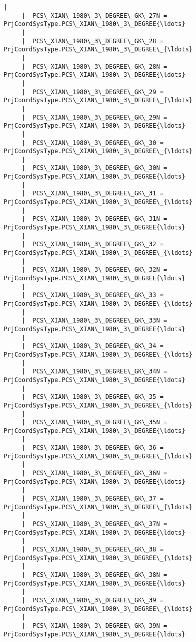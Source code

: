 \documentclass[11pt]{article}
\begin{document}
\begin{Verbatim}[commandchars=\\\{\}]
     |  
     |  PCS\_XIAN\_1980\_3\_DEGREE\_GK\_27N = PrjCoordSysType.PCS\_XIAN\_1980\_3\_DEGREE{\ldots}
     |  
     |  PCS\_XIAN\_1980\_3\_DEGREE\_GK\_28 = PrjCoordSysType.PCS\_XIAN\_1980\_3\_DEGREE\_{\ldots}
     |  
     |  PCS\_XIAN\_1980\_3\_DEGREE\_GK\_28N = PrjCoordSysType.PCS\_XIAN\_1980\_3\_DEGREE{\ldots}
     |  
     |  PCS\_XIAN\_1980\_3\_DEGREE\_GK\_29 = PrjCoordSysType.PCS\_XIAN\_1980\_3\_DEGREE\_{\ldots}
     |  
     |  PCS\_XIAN\_1980\_3\_DEGREE\_GK\_29N = PrjCoordSysType.PCS\_XIAN\_1980\_3\_DEGREE{\ldots}
     |  
     |  PCS\_XIAN\_1980\_3\_DEGREE\_GK\_30 = PrjCoordSysType.PCS\_XIAN\_1980\_3\_DEGREE\_{\ldots}
     |  
     |  PCS\_XIAN\_1980\_3\_DEGREE\_GK\_30N = PrjCoordSysType.PCS\_XIAN\_1980\_3\_DEGREE{\ldots}
     |  
     |  PCS\_XIAN\_1980\_3\_DEGREE\_GK\_31 = PrjCoordSysType.PCS\_XIAN\_1980\_3\_DEGREE\_{\ldots}
     |  
     |  PCS\_XIAN\_1980\_3\_DEGREE\_GK\_31N = PrjCoordSysType.PCS\_XIAN\_1980\_3\_DEGREE{\ldots}
     |  
     |  PCS\_XIAN\_1980\_3\_DEGREE\_GK\_32 = PrjCoordSysType.PCS\_XIAN\_1980\_3\_DEGREE\_{\ldots}
     |  
     |  PCS\_XIAN\_1980\_3\_DEGREE\_GK\_32N = PrjCoordSysType.PCS\_XIAN\_1980\_3\_DEGREE{\ldots}
     |  
     |  PCS\_XIAN\_1980\_3\_DEGREE\_GK\_33 = PrjCoordSysType.PCS\_XIAN\_1980\_3\_DEGREE\_{\ldots}
     |  
     |  PCS\_XIAN\_1980\_3\_DEGREE\_GK\_33N = PrjCoordSysType.PCS\_XIAN\_1980\_3\_DEGREE{\ldots}
     |  
     |  PCS\_XIAN\_1980\_3\_DEGREE\_GK\_34 = PrjCoordSysType.PCS\_XIAN\_1980\_3\_DEGREE\_{\ldots}
     |  
     |  PCS\_XIAN\_1980\_3\_DEGREE\_GK\_34N = PrjCoordSysType.PCS\_XIAN\_1980\_3\_DEGREE{\ldots}
     |  
     |  PCS\_XIAN\_1980\_3\_DEGREE\_GK\_35 = PrjCoordSysType.PCS\_XIAN\_1980\_3\_DEGREE\_{\ldots}
     |  
     |  PCS\_XIAN\_1980\_3\_DEGREE\_GK\_35N = PrjCoordSysType.PCS\_XIAN\_1980\_3\_DEGREE{\ldots}
     |  
     |  PCS\_XIAN\_1980\_3\_DEGREE\_GK\_36 = PrjCoordSysType.PCS\_XIAN\_1980\_3\_DEGREE\_{\ldots}
     |  
     |  PCS\_XIAN\_1980\_3\_DEGREE\_GK\_36N = PrjCoordSysType.PCS\_XIAN\_1980\_3\_DEGREE{\ldots}
     |  
     |  PCS\_XIAN\_1980\_3\_DEGREE\_GK\_37 = PrjCoordSysType.PCS\_XIAN\_1980\_3\_DEGREE\_{\ldots}
     |  
     |  PCS\_XIAN\_1980\_3\_DEGREE\_GK\_37N = PrjCoordSysType.PCS\_XIAN\_1980\_3\_DEGREE{\ldots}
     |  
     |  PCS\_XIAN\_1980\_3\_DEGREE\_GK\_38 = PrjCoordSysType.PCS\_XIAN\_1980\_3\_DEGREE\_{\ldots}
     |  
     |  PCS\_XIAN\_1980\_3\_DEGREE\_GK\_38N = PrjCoordSysType.PCS\_XIAN\_1980\_3\_DEGREE{\ldots}
     |  
     |  PCS\_XIAN\_1980\_3\_DEGREE\_GK\_39 = PrjCoordSysType.PCS\_XIAN\_1980\_3\_DEGREE\_{\ldots}
     |  
     |  PCS\_XIAN\_1980\_3\_DEGREE\_GK\_39N = PrjCoordSysType.PCS\_XIAN\_1980\_3\_DEGREE{\ldots}

\end{Verbatim}
\end{document}
